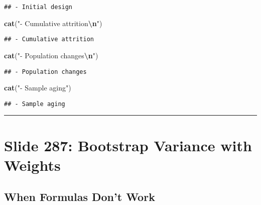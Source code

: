 \documentclass[
]{article}
\newenvironment{Shaded}{\begin{snugshade}}{\end{snugshade}}
\newcommand{\FunctionTok}[1]{\textcolor[rgb]{0.13,0.29,0.53}{\textbf{#1}}}
\newcommand{\NormalTok}[1]{#1}
\newcommand{\SpecialCharTok}[1]{\textcolor[rgb]{0.81,0.36,0.00}{\textbf{#1}}}
\newcommand{\StringTok}[1]{\textcolor[rgb]{0.31,0.60,0.02}{#1}}
\begin{document}
\begin{verbatim}
## - Initial design
\end{verbatim}

\begin{Shaded}
\begin{Highlighting}[]
\FunctionTok{cat}\NormalTok{(}\StringTok{"{-} Cumulative attrition}\SpecialCharTok{\textbackslash{}n}\StringTok{"}\NormalTok{)}
\end{Highlighting}
\end{Shaded}

\begin{verbatim}
## - Cumulative attrition
\end{verbatim}

\begin{Shaded}
\begin{Highlighting}[]
\FunctionTok{cat}\NormalTok{(}\StringTok{"{-} Population changes}\SpecialCharTok{\textbackslash{}n}\StringTok{"}\NormalTok{)}
\end{Highlighting}
\end{Shaded}

\begin{verbatim}
## - Population changes
\end{verbatim}

\begin{Shaded}
\begin{Highlighting}[]
\FunctionTok{cat}\NormalTok{(}\StringTok{"{-} Sample aging"}\NormalTok{)}
\end{Highlighting}
\end{Shaded}

\begin{verbatim}
## - Sample aging
\end{verbatim}

\begin{center}\rule{0.5\linewidth}{0.5pt}\end{center}

\section{Slide 287: Bootstrap Variance with
Weights}\label{slide-287-bootstrap-variance-with-weights}

\subsection{When Formulas Don't Work}\label{when-formulas-dont-work}
\end{document}
